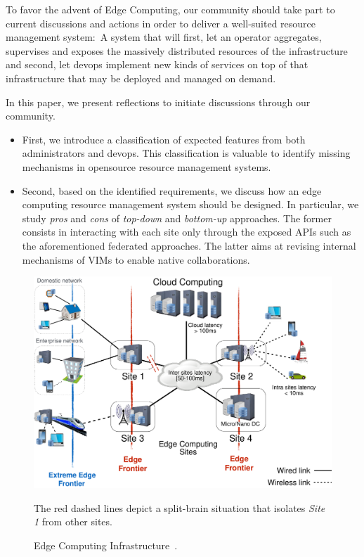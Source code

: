 To favor the advent of Edge Computing, our community should take part
to current discussions and actions in order to deliver a well-suited
resource management system:~A system that will first, let an operator
aggregates, supervises and exposes the massively distributed resources
of the infrastructure and second, let devops implement new kinds
of services on top of that infrastructure that may be deployed and
managed on demand.


In this paper, we present reflections to initiate discussions through our community.

\begin{itemize}
\item First, we introduce a classification of expected features from
  both administrators and devops. This classification is valuable to
  identify missing mechanisms in opensource resource management systems.
\item Second, based on the identified requirements, we discuss
  how an edge computing resource management system
  should be designed. In particular, we study \emph{pros} and
  \emph{cons} of \emph{top-down} and \emph{bottom-up} approaches. The
  former consists in interacting with each site only through the
  exposed APIs such as the aforementioned federated approaches. The
  latter aims at revising internal mechanisms of VIMs to enable native
  collaborations.
  \end{itemize}

\begin{figure}[t]
  \centering
  \includegraphics[width=\columnwidth]{./figures/figure_fog.pdf}
  \caption{Edge Computing Infrastructure~\cite{7923796}.}
    {\small The red dashed lines depict a split-brain situation that isolates
    \emph{Site 1} from other sites.}
  \label{fig:fogedge-archi}
\end{figure}

